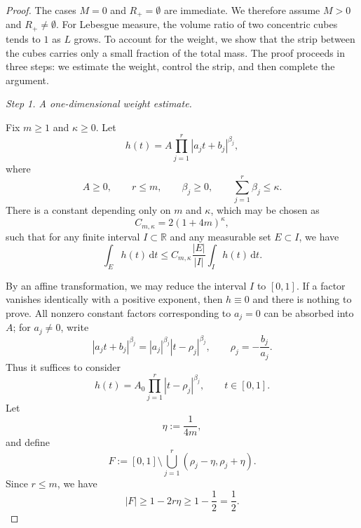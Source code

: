 \documentclass[10pt,a4paper]{amsart}
\begin{document}
\begin{proof}
The cases $M=0$ and $R_+=\emptyset$ are immediate. We therefore assume $M>0$ and $R_+\ne\emptyset$.
For Lebesgue measure, the volume ratio of two concentric cubes tends to $1$ as $L$ grows. To account for the weight, we show that the strip between the cubes carries only a small fraction of the total mass. The proof proceeds in three steps: we estimate the weight, control the strip, and then complete the argument.


\emph{Step 1. A one-dimensional weight estimate.}

 Fix $m\ge1$ and $\kappa\ge 0$. Let
\[
h(t)=A\prod_{j=1}^{r}|a_j t+b_j|^{\beta_j},
\]
where
\[
A\ge 0,\qquad r\le m,\qquad \beta_j\ge 0,\qquad \sum_{j=1}^{r}\beta_j\le \kappa.
\]
There is a constant depending only on $m$ and $\kappa$, which may be chosen as
\[
C_{m,\kappa}=2(1+4m)^{\kappa},
\]
such that for any finite interval $I\subset\mathbb{R}$ and any measurable set $E\subset I$, we have
\[
\int_{E} h(t)\,\mathrm{d}t \le C_{m,\kappa}\frac{|E|}{|I|}\int_{I} h(t)\,\mathrm{d}t.
\]

By an affine transformation, we may reduce the interval $I$ to $[0,1]$.
If a factor vanishes identically with a positive exponent, then $h\equiv0$ and there is nothing to prove. All nonzero constant factors corresponding to $a_j=0$ can be absorbed into $A$;
for $a_j\neq 0$, write
\[
|a_j t + b_j|^{\beta_j}=|a_j|^{\beta_j}|t-\rho_j|^{\beta_j},\qquad \rho_j=-\frac{b_j}{a_j}.
\]
Thus it suffices to consider
\[
h(t)=A_0\prod_{j=1}^{r}|t-\rho_j|^{\beta_j},\qquad t\in[0,1].
\]
Let
\[
\eta:=\frac{1}{4m},
\]
and define
\[
F:=[0,1]\setminus \bigcup_{j=1}^{r}(\rho_j-\eta,\rho_j+\eta).
\]
Since $r\le m$, we have
\begin{equation}
|F|\ge 1-2r\eta\ge 1-\frac12=\frac12.
\end{equation}


\end{proof}
\end{document}
